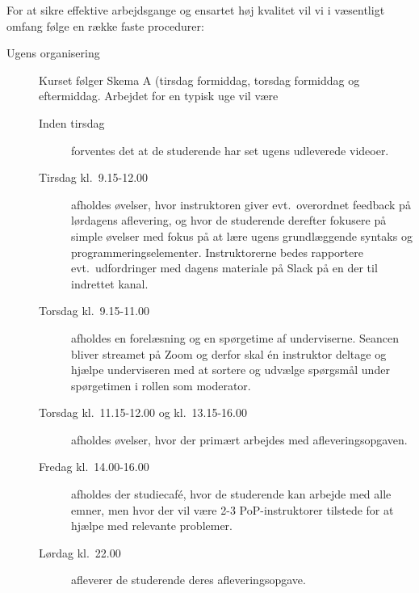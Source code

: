 \documentclass[a4paper]{article}
\begin{document}
For at sikre effektive arbejdsgange og ensartet høj kvalitet vil vi i
væsentligt omfang følge en række faste procedurer:
\begin{description}
\item[Ugens organisering] Kurset følger Skema A (tirsdag
  formiddag, torsdag formiddag og eftermiddag. Arbejdet for en typisk
  uge vil være
  \begin{description}
  \item[Inden tirsdag] forventes det at de studerende har set ugens
    udleverede videoer.
  \item[Tirsdag kl.\ 9.15-12.00] afholdes øvelser, hvor instruktoren
    giver evt.\ overordnet feedback på lørdagens aflevering, og hvor
    de studerende derefter fokusere på simple øvelser med fokus på at
    lære ugens grundlæggende syntaks og
    programmeringselementer. Instruktorerne bedes rapportere evt.\
    udfordringer med dagens materiale på Slack på en der til indrettet
    kanal.
  \item[Torsdag kl.\ 9.15-11.00] afholdes en forelæsning og en
    spørgetime af underviserne. Seancen bliver streamet på Zoom og
    derfor skal {\'e}n instruktor deltage og hjælpe underviseren med
    at sortere og udvælge spørgsmål under spørgetimen i rollen som
    moderator.
  \item[Torsdag kl.\ 11.15-12.00 og kl.\ 13.15-16.00] afholdes
    øvelser, hvor der primært arbejdes med afleveringsopgaven.
  \item[Fredag kl.\ 14.00-16.00] afholdes der studiecaf{\'e}, hvor de
    studerende kan arbejde med alle emner, men hvor der vil være 2-3
    PoP-instruktorer tilstede for at hjælpe med relevante problemer.
  \item[Lørdag kl.\ 22.00] afleverer de studerende deres afleveringsopgave.
  \end{description}


\end{description}
\end{document}
